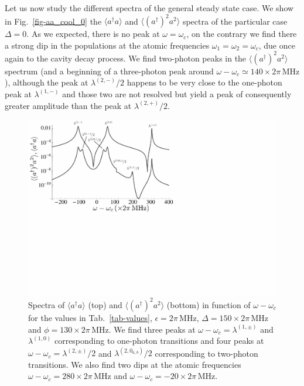 Let us now study the different spectra of the general steady state case. We show in Fig.~\ref{fig-aa_cool_0} the $\langle a^\dagger a \rangle$ and $\langle (a^\dagger)^2 a^2 \rangle$ spectra of the particular case $\Delta=0$. As we expected, there is no peak at  $\omega = \omega_c$, on the contrary we find there a strong dip in the populations at the atomic frequencies $\omega_1=\omega_2=\omega_c$, due once again to the cavity decay process. We find two-photon peaks in the $\langle (a^\dagger)^2 a^2 \rangle$ spectrum (and a beginning of a three-photon peak around $\omega-\omega_c \simeq 140\times 2\pi\,\mbox{MHz}$), although the peak at $\lambda^{(2,-)}/2$ happens to be very close to the one-photon peak at $\lambda^{(1,-)}$ and those two are not resolved but yield a peak of consequently greater amplitude than the peak at $\lambda^{(2,+)}/2$.

\begin{figure}
    \center
    \includegraphics[width=0.74 \textwidth]{Images/chap5/aa_cool_150.pdf}
    \caption[$\langle a^\dagger a \rangle$ and $\langle (a^\dagger)^2 a^2 \rangle$ in function of $\omega-\omega_c$ ]{Spectra of $\langle a^\dagger a \rangle$ (top) and $\langle (a^\dagger)^2 a^2 \rangle$ (bottom) in function of $\omega-\omega_c$ for the values in Tab.~\ref{tab-values}, $\epsilon= 2\pi\,\mbox{MHz}$, $\Delta=150 \times 2\pi\,\mbox{MHz}$ and $\phi=130\times 2\pi\,\mbox{MHz}$.  We find three peaks at $\omega-\omega_c=\lambda^{(1,\pm)}$ and $\lambda^{(1,0)}$ corresponding to one-photon transitions and four peaks at $\omega-\omega_c = \lambda^{(2,\pm)}/2$ and $\lambda^{(2,0_{a,b})}/2$ corresponding to two-photon transitions. We also find two dips at the atomic frequencies $\omega-\omega_c=280 \times 2\pi\,\mbox{MHz}$ and $\omega-\omega_c=-20 \times 2\pi\,\mbox{MHz}$.}
    \label{fig-aa_cool_150}
\end{figure}

